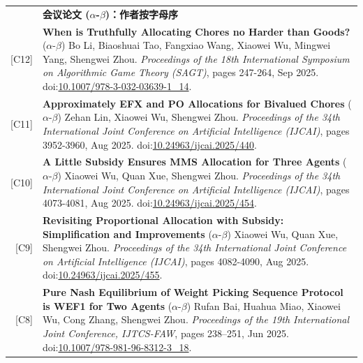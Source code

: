 \documentclass[UTF8, fontset=none, letterpaper, 11pt]{ctexart}
\newcommand{\headingfont}{\Large\bfseries\color{OliveGreen}}
\newenvironment{SectionTable}[1]{
  \renewcommand*{\arraystretch}{1.2}
  \setlength{\tabcolsep}{10pt}
  \begin{longtable}{Rp{5.2in}} & #1 \\}
{\end{longtable}\vspace{-1cm}}
\begin{document}
\begin{SectionTable}{\headingfont 会议论文 \; \small\color{black}  ($\alpha$-$\beta$)：作者按字母序}
{[C12]} &
\textbf{When is Truthfully Allocating Chores no Harder than Goods?} \newline
($\alpha$-$\beta$) Bo Li, Biaoshuai Tao, Fangxiao Wang, Xiaowei Wu, Mingwei Yang, Shengwei Zhou. \newline
\textit{Proceedings of the 18th International Symposium on Algorithmic Game Theory (SAGT)}, pages 247-264, Sep 2025. doi:\href{https://link.springer.com/chapter/10.1007/978-3-032-03639-1_14}{10.1007/978-3-032-03639-1\_14}. \\

{[C11]} &
\textbf{Approximately EFX and PO Allocations for Bivalued Chores} \newline
($\alpha$-$\beta$) Zehan Lin, Xiaowei Wu, Shengwei Zhou. \newline
\textit{Proceedings of the 34th International Joint Conference on Artificial Intelligence (IJCAI)}, pages 3952-3960, Aug 2025. doi:\href{https://doi.org/10.24963/ijcai.2025/440}{10.24963/ijcai.2025/440}.\\

{[C10]} &
\textbf{A Little Subsidy Ensures MMS Allocation for Three Agents} \newline
($\alpha$-$\beta$) Xiaowei Wu, Quan Xue, Shengwei Zhou. \newline
\textit{Proceedings of the 34th International Joint Conference on Artificial Intelligence (IJCAI)}, pages 4073-4081, Aug 2025. doi:\href{https://doi.org/10.24963/ijcai.2025/454}{10.24963/ijcai.2025/454}.\\

{\hypertarget{OR-IJCAI25}{[C9]}} &
\textbf{Revisiting Proportional Allocation with Subsidy: Simplification and Improvements} \newline
($\alpha$-$\beta$) Xiaowei Wu, Quan Xue, Shengwei Zhou.  \newline
\textit{Proceedings of the 34th International Joint Conference on Artificial Intelligence (IJCAI)}, pages 4082-4090, Aug 2025. doi:\href{https://doi.org/10.24963/ijcai.2025/455}{10.24963/ijcai.2025/455}. \\

{[C8]} &
\textbf{Pure Nash Equilibrium of Weight Picking Sequence Protocol is WEF1 for Two Agents} \newline
($\alpha$-$\beta$) Rufan Bai, Huahua Miao, Xiaowei Wu, Cong Zhang, Shengwei Zhou.  \newline
\textit{Proceedings of the 19th International Joint Conference, IJTCS-FAW}, pages 238--251, Jun 2025. doi:\href{https://link.springer.com/chapter/10.1007/978-981-96-8312-3_18}{10.1007/978-981-96-8312-3\_18}. \\


\end{SectionTable}
\end{document}
